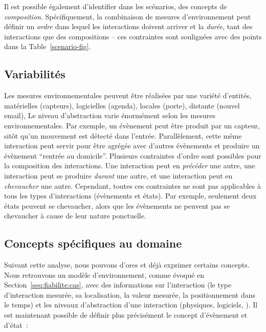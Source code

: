 Il est possible également d'identifier dans les scénarios, des concepts de 
{\em composition}. Spécifiquement, la combinaison de mesures d'environnement 
peut définir un {\em ordre} dans lequel les interactions doivent arriver et 
la {\em durée}, tant des interactions que des compositions -- ces contraintes 
sont soulignées avec des points dans la 
Table~\ref{scenario-fig}.

\subsection{Variabilités} 
Les mesures environnementales peuvent être réalisées 
par une variété d'entités, matérielles (\eg capteurs), logicielles (\eg agenda), 
locales (\eg porte), distante (\eg nouvel email), \etc 
Le niveau d'abstraction varie énormément selon les mesures environnementales. 
Par exemple, un évènement peut être produit par un capteur, sitôt qu'un 
mouvement est détecté dans l'entrée. Parallèlement, cette même interaction 
peut servir pour être agrégée avec d'autres évènements et produire un évènement
``rentrée au domicile''. 
Plusieurs contraintes d'ordre sont possibles pour la composition des 
interactions. Une interaction peut en {\em précéder} une autre, une interaction 
peut se produire {\em durant} une autre, et une interaction peut en {\em chevaucher} une 
autre. Cependant, toutes ces contraintes ne sont pas applicables à tous les types 
d'interactions (\ie évènements et états). Par exemple, seulement deux états 
peuvent se chevaucher, alors que les évènements ne peuvent pas se
chevaucher à cause de leur nature ponctuelle.

\subsection{Concepts spécifiques au domaine}

Suivant cette analyse, nous pouvons d'ores et déjà exprimer certains
concepts.  Nous retrouvons un modèle d'environnement, comme évoqué en
Section~\ref{seq:fiabilite:cas}, avec des informations sur
l'interaction (le type d'interaction mesurée, sa localisation,
la valeur mesurée, la positionnement dans le temps) et les niveaux
d'abstraction d'une interaction (\eg physiques, logiciels, \etc).
Il est maintenant possible de définir plus précisément le concept d'évènement et d'état~:

